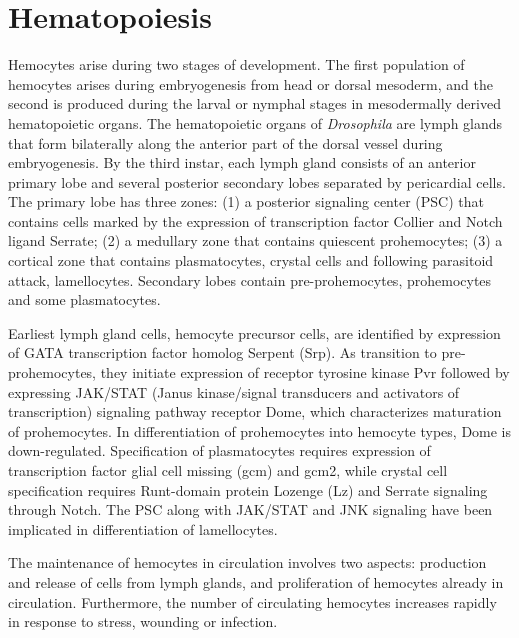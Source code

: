 \documentclass[11pt]{article}
\begin{document}
\section{Hematopoiesis}
Hemocytes arise during two stages of development. 
The first population of hemocytes arises during embryogenesis from head or dorsal mesoderm, and the second is produced during the larval or nymphal stages in mesodermally derived hematopoietic organs. 
The hematopoietic organs of \textit{Drosophila} are lymph glands that form bilaterally along the anterior part of the dorsal vessel during embryogenesis. 
By the third instar, each lymph gland consists of an anterior primary lobe and several posterior secondary lobes separated by pericardial cells. 
The primary lobe has three zones: 
(1) a posterior signaling center (PSC) that contains cells marked by the expression of transcription factor Collier and Notch ligand Serrate; 
(2) a medullary zone that contains quiescent prohemocytes; 
(3) a cortical zone that contains plasmatocytes, crystal cells and following parasitoid attack, lamellocytes. 
Secondary lobes contain pre-prohemocytes, prohemocytes and some plasmatocytes. 

\newline

Earliest lymph gland cells, hemocyte precursor cells, are identified by expression of GATA transcription factor homolog Serpent (Srp). 
As transition to pre-prohemocytes, they initiate expression of receptor tyrosine kinase Pvr followed by expressing JAK/STAT (Janus kinase/signal transducers and activators of transcription) signaling pathway receptor Dome, which characterizes maturation of prohemocytes. 
In differentiation of prohemocytes into hemocyte types, Dome is down-regulated. 
Specification of plasmatocytes requires expression of transcription factor glial cell missing (gcm) and gcm2, while crystal cell specification requires Runt-domain protein Lozenge (Lz) and Serrate signaling through Notch. 
The PSC along with JAK/STAT and JNK signaling have been implicated in differentiation of lamellocytes.

\newline

The maintenance of hemocytes in circulation involves two aspects: production and release of cells from lymph glands, and proliferation of hemocytes already in circulation. 
Furthermore, the number of circulating hemocytes increases rapidly in response to stress, wounding or infection. 
\end{document}
